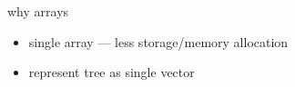 \begin{frame}{why arrays}
\begin{itemize}
\item single array --- less storage/memory allocation
\item represent tree as single vector
\end{itemize}
\end{frame}
